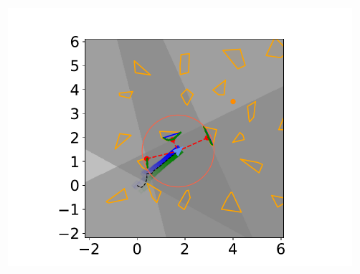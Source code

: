 \begin{figure}[H]
\begin{subfigure}{0.20\textwidth}
        \includegraphics[width=\textwidth]{../figures/Simulations/sim2unkenv/frame_4.pdf}
    \end{subfigure}


\end{figure}

